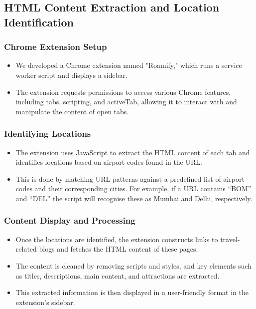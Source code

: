 \documentclass[conference]{IEEEtran}
\begin{document}
    \subsection{HTML Content Extraction and Location Identification}

        \subsubsection{Chrome Extension Setup}
        \begin{itemize}
            \item We developed a Chrome extension named "Roamify," which runs a service worker script and displays a sidebar.
            \item The extension requests permissions to access various Chrome features, including tabs, scripting, and activeTab, allowing it to interact with and manipulate the content of open tabs.
        \end{itemize}

        \subsubsection{Identifying Locations}
        \begin{itemize}
            \item The extension uses JavaScript to extract the HTML content of each tab and identifies locations based on airport codes found in the URL.
            \item This is done by matching URL patterns against a predefined list of airport codes and their corresponding cities. For example, if a URL contains “BOM” and “DEL” the script will recognise these as Mumbai and Delhi, respectively.
        \end{itemize}

        \subsubsection{Content Display and Processing}
        \begin{itemize}
            \item Once the locations are identified, the extension constructs links to travel-related blogs and fetches the HTML content of these pages.
            \item The content is cleaned by removing scripts and styles, and key elements such as titles, descriptions, main content, and attractions are extracted.
            \item This extracted information is then displayed in a user-friendly format in the extension’s sidebar.
        \end{itemize}
\end{document}
